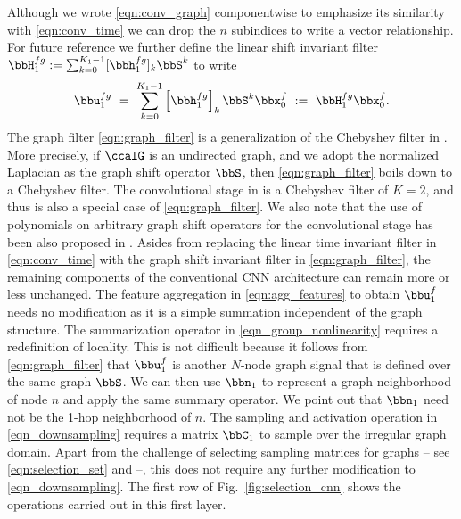 Although we wrote \eqref{eqn:conv_graph} componentwise to emphasize its similarity with \eqref{eqn:conv_time} we can drop the $n$ subindices to write a vector relationship. For future reference we further define the linear shift invariant filter $\bbH_{1}^{fg} := \sum_{k=0}^{K_1-1} [\bbh_{1}^{fg}]_{k} \bbS^{k}$ to write
% 
\begin{equation} \label{eqn:graph_filter}
   \bbu_{1}^{fg} 
	\ =  \ \sum_{k=0}^{K_1-1} 
	             \Big[ \bbh_{1}^{fg} \Big]_{k} \,
	             \bbS^{k} 
	             \bbx_{0}^{f}
    \ := \ \bbH_{1}^{fg}\bbx_{0}^{f}.
\end{equation}
%
The graph filter \eqref{eqn:graph_filter} is a generalization of the Chebyshev filter in \cite{defferrard17-cnngraphs}. More precisely, if $\ccalG$ is an undirected graph, and we adopt the normalized Laplacian as the graph shift operator $\bbS$, then \eqref{eqn:graph_filter} boils down to a Chebyshev filter. The convolutional stage in \cite{kipf17-classifgcnn} is a Chebyshev filter of $K=2$, and thus is also a special case of \eqref{eqn:graph_filter}. We also note that the use of polynomials on arbitrary graph shift operators for the convolutional stage has been also proposed in \cite{du17-topoadapt, gama18-nvgf}.
Asides from replacing the linear time invariant filter in \eqref{eqn:conv_time} with the graph shift invariant filter in \eqref{eqn:graph_filter}, the remaining components of the conventional CNN architecture can remain more or less unchanged. The feature aggregation in \eqref{eqn:agg_features} to obtain $\bbu_{1}^{f}$ needs no modification as it is a simple summation independent of the graph structure. The summarization operator in \eqref{eqn_group_nonlinearity} requires a redefinition of locality. This is not difficult because it follows from \eqref{eqn:graph_filter} that $\bbu_{1}^{f}$ is another $N$-node graph signal that is defined over the same graph $\bbS$. We can then use $\bbn_1$ to represent a graph neighborhood of node $n$ and apply the same summary operator. We point out that $\bbn_1$ need not be the 1-hop neighborhood of $n$. The sampling and activation operation in \eqref{eqn_downsampling} requires a matrix $\bbC_1$ to sample over the irregular graph domain. Apart from the challenge of selecting sampling matrices for graphs -- see \eqref{eqn:selection_set} and \cite{chen15-selection, marques16-aggregation, anis16-spectralproxies, tsitsvero16-uncertainty} --, this does not require any further modification to \eqref{eqn_downsampling}. The first row of Fig.~\ref{fig:selection_cnn} shows the operations carried out in this first layer.

